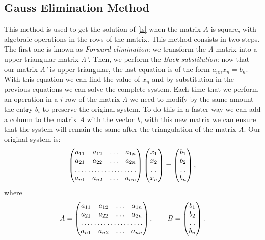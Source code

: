 \documentclass[12pt]{report}
\begin{document}
\subsection{Gauss Elimination Method}
This method is used to get the solution of \eqref{ls} when the matrix $A$ is square, with algebraic operations in the rows of the matrix. This method consists in two steps. The first one is known as \emph{Forward elimination}:
we transform the \emph{A} matrix into a upper triangular matrix \emph{A'}. Then, we perform the \emph{Back substitution}: now that our matrix \emph{A'} is upper triangular, the last equation is of the form
$a_{nn}x_n=b_n$. With this equation we can find the value of $x_n$ and by substitution in the previous equations we can solve the complete system.
Each time that we perform an operation in a $i$ row of the matrix \emph{A} we need to modify by the same amount the entry $b_i$ to preserve the original system. To do this in a faster way we can add a
column to the matrix \emph{A} with the vector \emph{b}, with this new matrix we can ensure that the system will remain the same after the triangulation of the matrix \emph{A}.
Our original system is:
\begin{equation*}
\begin{pmatrix}
a_{11} & a_{12} & \dots & a_{1n}\\
a_{21} & a_{22} & \dots & a_{2n}\\
\hdotsfor{4}\\
a_{n1} & a_{n2} & \dots &a_{nn}
\end{pmatrix}
\begin{pmatrix}
x_{1}\\
x_{2}\\
\hdotsfor{1}\\
x_{n}
\end{pmatrix}
=
\begin{pmatrix}
b_{1}\\
b_{2}\\
\hdotsfor{1}\\
b_{n}
\end{pmatrix},
\end{equation*}
where
\begin{equation*}
A=
\begin{pmatrix}
a_{11} & a_{12} & \dots & a_{1n}\\
a_{21} & a_{22} & \dots & a_{2n}\\
\hdotsfor{4}\\
a_{n1} & a_{n2} & \dots &a_{nn}
\end{pmatrix},
\qquad B=
\begin{pmatrix}
b_{1}\\
b_{2}\\
\hdotsfor{1}\\
b_{n}
\end{pmatrix}.
\end{equation*}
\end{document}
